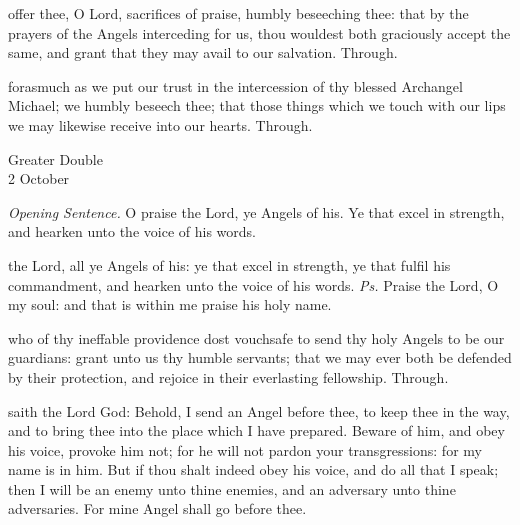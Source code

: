 
\secret
{} offer thee, O Lord, sacrifices of praise, humbly beseeching thee: that by the prayers of the Angels interceding for us, thou wouldest both graciously accept the same, and grant that they may avail to our salvation. Through.


\postcommunion
{} forasmuch as we put our trust in the intercession of thy blessed Archangel Michael; we humbly beseech thee; that those things which we touch with our lips we may likewise receive into our hearts. Through.


\begin{inhead}
	{Greater Double\\
		2 October}
\end{inhead}
\par\noindent
\textit{Opening Sentence.} O praise the Lord, ye Angels of his. Ye that excel in strength, and hearken unto the voice of his words.

\introit
{} the Lord, all ye Angels of his: ye that excel in strength, ye that fulfil his commandment, and hearken unto the voice of his words. \textit{Ps.} Praise the Lord, O my soul: and that is within me praise his holy name.

\collect
{} who of thy ineffable providence dost vouchsafe to send thy holy Angels to be our guardians: grant unto us thy humble servants; that we may ever both be defended by their protection, and rejoice in their everlasting fellowship. Through.

 saith the Lord God: Behold, I send an Angel before thee, to keep thee in the way, and to bring thee into the place which I have prepared. Beware of him, and obey his voice, provoke him not; for he will not pardon your transgressions: for my name is in him. But if thou shalt indeed obey his voice, and do all that I speak; then I will be an enemy unto thine enemies, and an adversary unto thine adversaries. For mine Angel shall go before thee.


